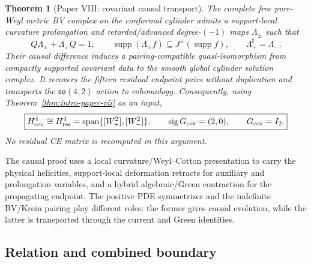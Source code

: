 \documentclass[11pt]{article}
\newtheorem{theorem}{Theorem}[section]
\theoremstyle{remark}
\begin{document}
\begin{theorem}[Paper VIII: covariant causal transport]
\label{thm:intro-paper-viii}
The complete free pure-Weyl metric BV complex on the conformal cylinder
admits a support-local curvature prolongation and retarded/advanced
degree-$(-1)$ maps $\Lambda_\pm$ such that
\begin{equation}\label{eq:intro-causal-homotopy}
 Q\Lambda_\pm+\Lambda_\pm Q=1,
 \qquad
 \operatorname{supp}(\Lambda_\pm f)
 \subseteq J^\pm(\operatorname{supp}f),
 \qquad
 \Lambda_+^\sharp=\Lambda_-.
\end{equation}
Their causal difference induces a pairing-compatible quasi-isomorphism from
compactly supported covariant data to the smooth global cylinder solution
complex.  It recovers the fifteen residual endpoint pairs without
duplication and transports the $\mathfrak{so}(4,2)$ action to cohomology.
Consequently, using Theorem~\ref{thm:intro-paper-vii} as an input,
\begin{equation}\label{eq:intro-paperVIII-result}
 \boxed{
 H^4_{\rm cov}\cong H^4_{\rm res}
 =\operatorname{span}\{[W_+^2],[W_-^2]\},
 \qquad \operatorname{sig}G_{\rm cov}=(2,0),
 \qquad G_{\rm cov}=I_2.}
\end{equation}
No residual CE matrix is recomputed in this argument.
\end{theorem}

The causal proof uses a local curvature/Weyl--Cotton presentation to carry
the physical helicities, support-local deformation retracts for auxiliary
and prolongation variables, and a hybrid algebraic/Green contraction for
the propagating endpoint.  The positive PDE symmetrizer and the indefinite
BV/Krein pairing play different roles: the former gives causal evolution,
while the latter is transported through the current and Green identities.

\subsection{Relation and combined boundary}
\end{document}
